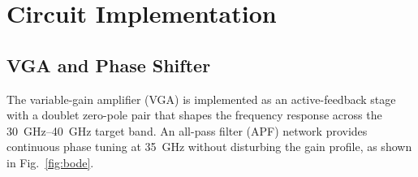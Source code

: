 \section{Circuit Implementation}
\label{sec:circuit}

\subsection{VGA and Phase Shifter}

The variable-gain amplifier (VGA) is implemented as an active-feedback stage
with a doublet zero-pole pair that shapes the frequency response across the
\SIrange{30}{40}{\giga\hertz} target band. An all-pass filter (APF) network
provides continuous phase tuning at \SI{35}{\giga\hertz} without disturbing
the gain profile, as shown in Fig.~\ref{fig:bode}.

